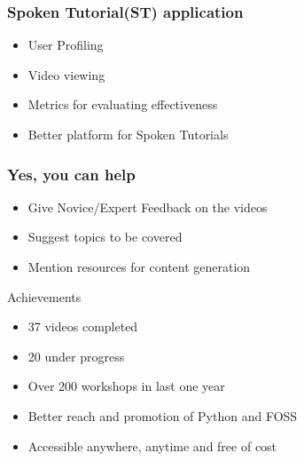 \documentclass[compress,red]{beamer} %
\begin{document}
\begin{frame}
\frametitle{Spoken Tutorial(ST) application}
\begin{itemize}
\item User Profiling
\item Video viewing
\item Metrics for evaluating effectiveness
\item Better platform for Spoken Tutorials
\end{itemize}
\end{frame}

\begin{frame}
\frametitle{Yes, you can help}
\begin{itemize}
\item Give Novice/Expert Feedback on the videos
\item Suggest topics to be covered
\item Mention resources for content generation
\end{itemize}
\begin{block}{Achievements}
\begin{itemize}
\item 37 videos completed
\item 20 under progress
\item Over 200 workshops in last one year
\item Better reach and promotion of Python and FOSS
\item Accessible anywhere, anytime and free of cost
\end{itemize}
\end{block}
\end{frame}

\section*{}
\end{document}
